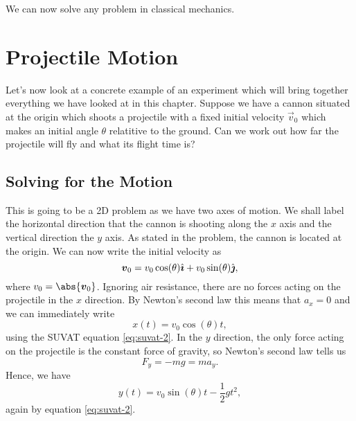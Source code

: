\documentclass[../classical_mechanics.tex]{subfiles}
\begin{document}
        We can now solve any problem in classical mechanics.

    \section{Projectile Motion}\label{sec:projectile-motion}
        Let's now look at a concrete example of an experiment which will bring together everything we have looked at in this chapter.
        Suppose we have a cannon situated at the origin which shoots a projectile with a fixed initial velocity $\vec{v}_0$ which makes an initial angle $\theta$ relatitive to the ground.
        Can we work out how far the projectile will fly and what its flight time is?

        \subsection{Solving for the Motion}\label{sec:projectile-motion:subsec:solving-for-the-motion}
            This is going to be a 2D problem as we have two axes of motion.
            We shall label the horizontal direction that the cannon is shooting along the $x$ axis and the vertical direction the $y$ axis.
            As stated in the problem, the cannon is located at the origin.
            We can now write the initial velocity as
            \begin{equation}
                \boldsymbol{v}_0 = v_0\cos(\theta)\hat{\boldsymbol{\imath}} + v_0\sin(\theta)\hat{\boldsymbol{\jmath}},
            \end{equation}
            where $v_0=\abs{\vec{v}_0}$.
            Ignoring air resistance, there are no forces acting on the projectile in the $x$ direction.
            By Newton's second law this means that $a_x=0$ and we can immediately write
            \begin{equation}
                x(t) = v_0\cos(\theta)t,
            \end{equation}
            using the SUVAT equation \ref{eq:suvat-2}.
            In the $y$ direction, the only force acting on the projectile is the constant force of gravity, so Newton's second law tells us
            \begin{equation}
                F_y = -mg = ma_y.
            \end{equation}
            Hence, we have
            \begin{equation}
                y(t) = v_0\sin(\theta)t - \frac{1}{2}gt^2,
            \end{equation}
            again by equation \ref{eq:suvat-2}.
\end{document}
